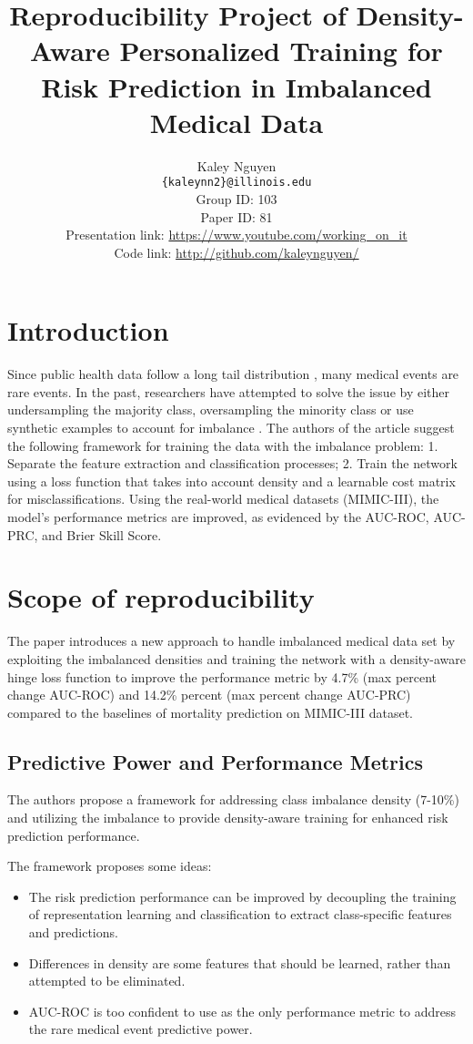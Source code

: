 \documentclass[11pt,a4paper]{article}
\title{Reproducibility Project of Density-Aware Personalized Training for Risk Prediction in Imbalanced Medical Data}
\author{Kaley Nguyen \\
  \texttt{\{kaleynn2\}@illinois.edu}
  \\[2em]
  Group ID: 103\\
  Paper ID: 81 \cite{huo2022densityaware}\\
  Presentation link: \url{https://www.youtube.com/working_on_it} \\
  Code link: \url{http://github.com/kaleynguyen/}}
\begin{document}
\maketitle


\section{Introduction}
Since public health data follow a long tail distribution \cite{longtail}, many medical events are rare events. In the past, researchers have attempted to solve the issue by either undersampling the majority class, oversampling the minority class \cite{sampling} or use synthetic examples to account for imbalance \cite{smote}. The authors of the article suggest the following framework for training the data with the imbalance problem: 1. Separate the feature extraction and classification processes; 2. Train the network using a loss function that takes into account density and a learnable cost matrix for misclassifications. Using the real-world medical datasets (MIMIC-III), the model's performance metrics are improved, as evidenced by the AUC-ROC, AUC-PRC, and Brier Skill Score.

\section{Scope of reproducibility}

The paper introduces a new approach to handle imbalanced medical data set by exploiting the imbalanced densities and training the network with a density-aware hinge loss function to improve the performance metric by 4.7\% (max percent change AUC-ROC) and 14.2\% percent (max percent change AUC-PRC) compared to the baselines of mortality prediction on MIMIC-III dataset. 

\subsection{Predictive Power and Performance Metrics}
The authors propose a framework for addressing class imbalance density (7-10\%) and utilizing the imbalance to provide density-aware training for enhanced risk prediction performance.  

The framework proposes some ideas: 
\begin{itemize}
    \item The risk prediction performance can be improved by decoupling the training of representation learning and classification to extract class-specific features and predictions.  
    \item Differences in density are some features that should be learned, rather than attempted to be eliminated. 
    \item AUC-ROC is too confident to use as the only performance metric to address the rare medical event predictive power. 
\end{itemize}
\end{document}
